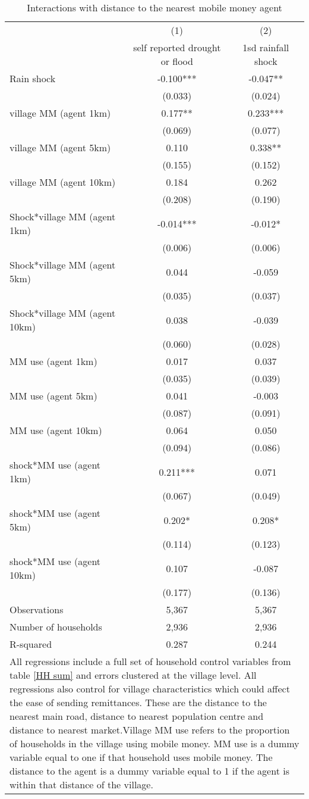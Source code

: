 \begin{table}
\centering \caption{Interactions with distance to the nearest mobile money agent} \label{distance}
\def\arraystretch{0.80}
\begin{tabular}{lcc} \hline
 & (1) & (2) \\
 & self reported drought or flood & 1sd rainfall shock \\ \hline
Rain shock & -0.100*** & -0.047** \\
& (0.033) & (0.024) \\
village MM (agent 1km) & 0.177** & 0.233*** \\
 & (0.069) & (0.077) \\
village MM (agent 5km) & 0.110 & 0.338** \\
 & (0.155) & (0.152) \\
village MM (agent 10km) & 0.184 & 0.262\\
 & (0.208) & (0.190) \\
Shock*village MM (agent 1km)  & -0.014*** &  -0.012* \\
 & (0.006) &  (0.006)  \\
Shock*village MM (agent 5km) & 0.044 & -0.059 \\
 & (0.035) & (0.037)  \\
Shock*village MM (agent 10km)  & 0.038 & -0.039 \\
 & (0.060) &  (0.028) \\
MM use (agent 1km)  & 0.017 & 0.037 \\
 & (0.035) & (0.039) \\
MM use (agent 5km) & 0.041 & -0.003 \\
 & (0.087) & (0.091) \\
MM use (agent 10km) & 0.064 & 0.050 \\
 & (0.094) & (0.086) \\
shock*MM use (agent 1km) & 0.211*** &  0.071  \\
 & (0.067) &  (0.049) \\
shock*MM use (agent 5km) & 0.202* & 0.208* \\
 & (0.114) & (0.123) \\
shock*MM use (agent 10km) & 0.107 &  -0.087   \\
 & (0.177) &  (0.136) \\
Observations & 5,367 & 5,367 \\
Number of households & 2,936 & 2,936 \\
R-squared & 0.287 & 0.244 \\
  \hline
\multicolumn{3}{p{14cm}}{All regressions include a full set of household control variables from table \ref{HH sum} and errors clustered at the village level.  All regressions also control for village characteristics which could affect the ease of sending remittances. These are the distance to the nearest main road, distance to nearest population centre and distance to nearest market.Village MM use refers to the proportion of households in the village using mobile money. MM use is a dummy variable equal to one if that household uses mobile money. The distance to the agent is a dummy variable equal to 1 if the agent is within that distance of the village.} \\

\end{tabular}
\end{table}
